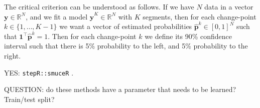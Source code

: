 \documentclass{article}
\newcommand{\RR}{\mathbb R}
\begin{document}
The critical criterion can be understood as follows. If we have $N$
data in a vector $\mathbf y\in\RR^N$, and we fit a model $\mathbf{\hat
  y}^K\in\RR^N$ with $K$ segments, then for each change-point
$k\in\{1, \dots, K-1\}$ we want a vector of estimated probabilities
$\mathbf{\hat p}^k\in[0,1]^N$ such that $\mathbf
1^\intercal\mathbf{\hat p}^k = 1$. Then for each change-point $k$ we
define its 90\% confidence interval such that there is 5\% probability
to the left, and 5\% probability to the right.

YES: \verb|stepR::smuceR| \citep{multiscale}.

QUESTION: do these methods have a parameter that needs to be learned?
Train/test split?



\end{document}
